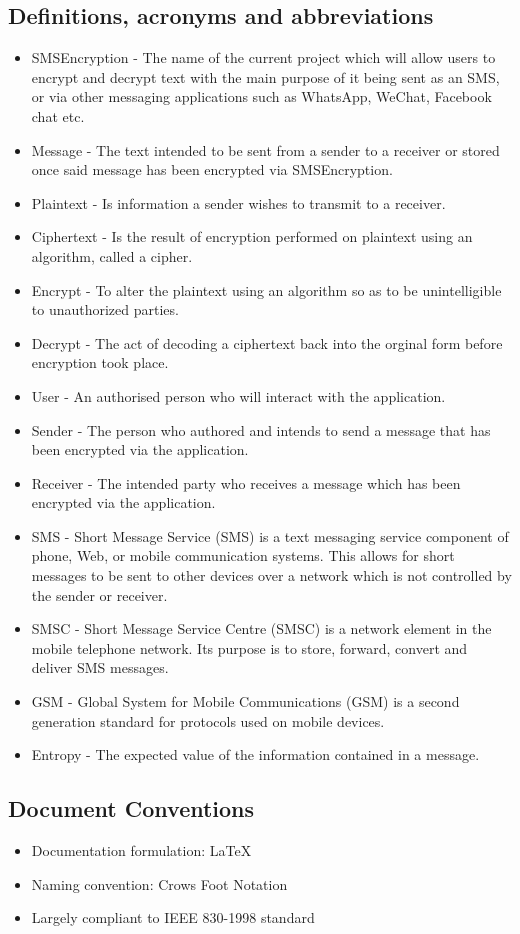\subsection{Definitions, acronyms and abbreviations}
\begin{itemize}
\item SMSEncryption - The name of the current project which will allow users to encrypt and decrypt text with the main purpose of it being sent as an SMS, or via other messaging applications such as WhatsApp, WeChat, Facebook chat etc.
\item Message - The text intended to be sent from a sender to a receiver  or stored once said message has been encrypted via SMSEncryption.
\item Plaintext -  Is information a sender wishes to transmit to a receiver. 
\item Ciphertext - Is the result of encryption performed on plaintext using an algorithm, called a cipher.
\item Encrypt -  To alter the plaintext using an algorithm so as to be unintelligible to unauthorized parties.
\item Decrypt - The act of decoding a ciphertext back into the orginal form before encryption took place.
\item User - An authorised person who will interact with the application.
\item Sender - The person who authored and intends to send a message that has been encrypted via the application.
\item Receiver - The intended party who receives a message which has been encrypted via the application.
\item SMS - Short Message Service (SMS) is a text messaging service component of phone, Web, or mobile communication systems. This allows for short messages to be sent to other devices over a network which is not controlled by the sender or receiver.
\item SMSC - Short Message Service Centre (SMSC) is a network element in the mobile telephone network. Its purpose is to store, forward, convert and deliver SMS messages.
\item GSM - Global System for Mobile Communications (GSM) is a second generation standard for protocols used on mobile devices.
\item Entropy -  The expected value of the information contained in a message.
\end{itemize}

\subsection{Document Conventions}
\begin{itemize}
\item Documentation formulation: LaTeX
\item Naming convention: Crows Foot Notation
\item Largely compliant to IEEE 830-1998 standard
\end{itemize}

